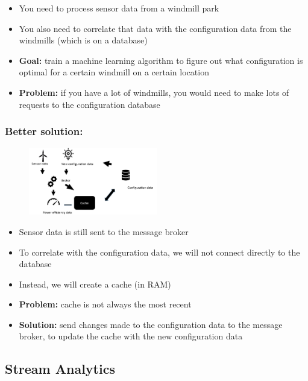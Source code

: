 \documentclass{article}
\begin{document}
\begin{itemize}
    \item You need to process sensor data from a windmill park
    \item You also need to correlate that data with the configuration data from the windmills (which is on a database)
    \item \textbf{Goal:} train a machine learning algorithm to figure out what configuration is optimal for a certain windmill on a certain location
    \item \textbf{Problem:} if you have a lot of windmills, you would need to make lots of requests to the configuration database
\end{itemize}

\subsubsection{Better solution:}

\begin{figure}[H]
    \centering
    \includegraphics[width=0.5\textwidth]{events-data-architecture-2.png}
\end{figure}

\begin{itemize}
    \item Sensor data is still sent to the message broker
    \item To correlate with the configuration data, we will not connect directly to the database
    \item Instead, we will create a cache (in RAM)
    \item \textbf{Problem:} cache is not always the most recent 
    \item \textbf{Solution:} send changes made to the configuration data to the message broker, to update the cache with the new configuration data
\end{itemize}

\subsection{Stream Analytics}
\end{document}
